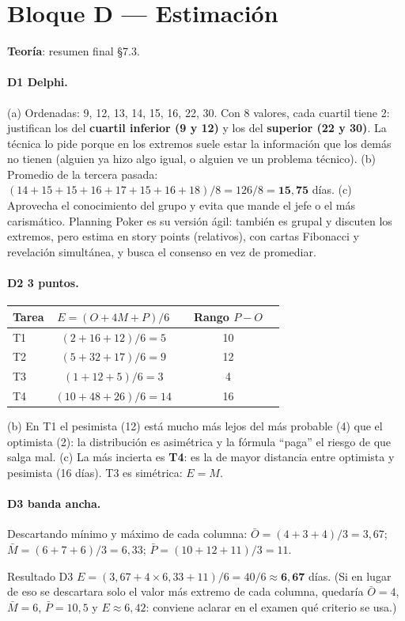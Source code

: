\documentclass[11pt,a4paper]{article}
\begin{document}
\section{Bloque D --- Estimación}
\textbf{Teoría}: resumen final §7.3.
\paragraph{D1 Delphi.} (a) Ordenadas: 9, 12, 13, 14, 15, 16, 22, 30. Con 8 valores, cada cuartil tiene 2: justifican
los del \textbf{cuartil inferior (9 y 12)} y los del \textbf{superior (22 y 30)}. La técnica lo pide porque en los
extremos suele estar la información que los demás no tienen (alguien ya hizo algo igual, o alguien ve un problema
técnico). (b) Promedio de la tercera pasada: $(14 + 15 + 15 + 16 + 17 + 15 + 16 + 18)/8 = 126/8 =
\mathbf{15{,}75}$ días. (c) Aprovecha el conocimiento del grupo y evita que mande el jefe o el más carismático.
Planning Poker es su versión ágil: también es grupal y discuten los extremos, pero estima en story points (relativos),
con cartas Fibonacci y revelación simultánea, y busca el consenso en vez de promediar.

\paragraph{D2 3 puntos.}
\begin{center}\small
\begin{tabular}{lcccc}
\toprule
Tarea & $E = (O + 4M + P)/6$ & & Rango $P - O$\\
\midrule
T1 & $(2 + 16 + 12)/6 = 5$ & & 10\\
T2 & $(5 + 32 + 17)/6 = 9$ & & 12\\
T3 & $(1 + 12 + 5)/6 = 3$ & & 4\\
T4 & $(10 + 48 + 26)/6 = 14$ & & 16\\
\bottomrule
\end{tabular}
\end{center}
(b) En T1 el pesimista (12) está mucho más lejos del más probable (4) que el optimista (2): la distribución es
asimétrica y la fórmula ``paga'' el riesgo de que salga mal. (c) La más incierta es \textbf{T4}: es la de mayor
distancia entre optimista y pesimista (16 días). T3 es simétrica: $E = M$.

\paragraph{D3 banda ancha.} Descartando mínimo y máximo de cada columna: $\bar O = (4 + 3 + 4)/3 = 3{,}67$; $\bar
M = (6 + 7 + 6)/3 = 6{,}33$; $\bar P = (10 + 12 + 11)/3 = 11$.
\begin{resultado}{Resultado D3}
$E = (3{,}67 + 4 \times 6{,}33 + 11)/6 = 40/6 \approx \mathbf{6{,}67}$ días. (Si en lugar de eso se descartara
solo el valor más extremo de cada columna, quedaría $\bar O = 4$, $\bar M = 6$, $\bar P = 10{,}5$ y $E \approx
6{,}42$: conviene aclarar en el examen qué criterio se usa.)
\end{resultado}
\end{document}

